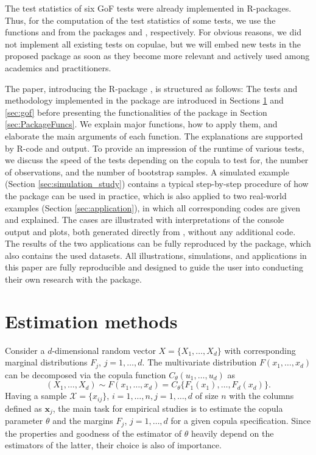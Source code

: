 The test statistics of six GoF tests were already implemented in R-packages. Thus, for the computation of the test statistics of some tests, we use the functions  and  from the packages  and , respectively. For obvious reasons, we did not implement all existing tests on copulae, but we will embed new tests in the proposed package as soon as they become more relevant and actively used among academics and practitioners.

The paper, introducing the R-package , is structured as follows: The tests and methodology implemented in the package are introduced in Sections \ref{sec:estimation} and \ref{sec:gof} before presenting the functionalities of the package in Section \ref{sec:PackageFuncs}. We explain major functions, how to apply them, and elaborate the main arguments of each function. The explanations are supported by R-code and output. To provide an impression of the runtime of various tests, we discuss the speed of the tests depending on the copula to test for, the number of observations, and the number of bootstrap samples. A simulated example (Section \ref{sec:simulation_study}) contains a typical step-by-step procedure of how the package can be used in practice, which is also applied to two real-world examples (Section \ref{sec:application}), in which all corresponding codes are given and explained. The cases are illustrated with interpretations of the console output and plots, both generated directly from , without any additional code. The results of the two applications can be fully reproduced by the  package, which also contains the used datasets. All illustrations, simulations, and applications in this paper are fully reproducible and designed to guide the user into conducting their own research with the  package. 

\section[Estimation methods]{Estimation methods}\label{sec:estimation}
Consider a $d$-dimensional random vector $X = \{X_1, \ldots, X_d\}$ with corresponding marginal distributions $F_j$, $j=1,\ldots,d$. The  multivariate distribution $F(x_1,\ldots, x_d)$ can be decomposed via the copula function $C_\theta(u_1, \ldots, u_d)$ as  
\begin{equation*}
	(X_1, \ldots, X_d)\sim F(x_1,\ldots, x_d) = C_\theta\{F_1(x_1), \ldots, F_d(x_d)\}.
\end{equation*}
Having a sample $\mathcal{X} = \{x_{ij}\}$, $i=1,\ldots, n, j=1,\ldots, d$ of size $n$ with the columns defined as $\mathbf{x}_j$, the main task for empirical studies is to estimate the copula parameter $\theta$ and the margins $F_j$, $j=1,\ldots,d$ for a given copula specification. Since the properties and goodness of the estimator of $\theta$ heavily depend on the estimators of the latter, their choice is also of importance.

